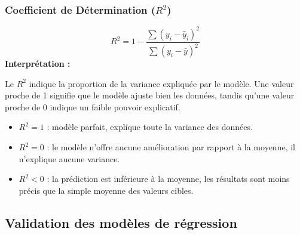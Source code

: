 \subsubsection{Coefficient de Détermination ($R^2$)}
\begin{equation}
R^2 = 1 - \frac{\sum (y_i - \hat{y}_i)^2}{\sum (y_i - \bar{y})^2}
\end{equation}
\textbf{Interprétation :} 

Le $R^2$ indique la proportion de la variance expliquée par le modèle. Une valeur proche de 1 signifie que le modèle ajuste bien les données, tandis qu'une valeur proche de 0 indique un faible pouvoir explicatif.
\begin{itemize}
	\item $R^2 = 1$ : modèle parfait, explique toute la variance des données.
	\item $R^2 = 0$ : le modèle n'offre aucune amélioration par rapport à la moyenne, il n'explique aucune variance.
	 \item $R^2 < 0$ : la prédiction est inférieure à la moyenne, les résultats sont moins précis que la simple moyenne des valeurs cibles.
\end{itemize}


\subsection{Validation des modèles de régression}

